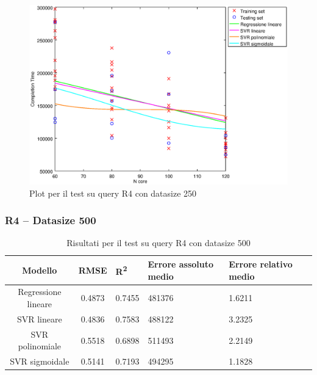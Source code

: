 \documentclass[a4paper,11pt]{article}
\begin{document}
\begin {figure}[hbtp]
\centering
\includegraphics[width=\textwidth]{output/R4_250/plot_R4_250.eps}
\caption {Plot per il test su query R4 con datasize 250}
\end {figure}
\newpage
\subsubsection{R4 -- Datasize 500}
\begin{table}[bhpt]
	\centering
	\begin{adjustbox}{center}
		\begin{tabular}{c | c M{1cm} M{2.5cm} M{2.5cm} M{1.8cm}}
			Modello & RMSE & R\textsuperscript{2} & Errore assoluto medio & Errore relativo medio \tabularnewline
			\hline
			Regressione lineare & 0.4873 & 0.7455 & 481376 & 1.6211 \\
			SVR lineare & 0.4836 & 0.7583 & 488122 & 3.2325 \\
			SVR polinomiale & 0.5518 & 0.6898 & 511493 & 2.2149 \\
			SVR sigmoidale & 0.5141 & 0.7193 & 494295 & 1.1828 \\
		\end{tabular}
	\end{adjustbox}
	\\
	\caption{Risultati per il test su query R4 con datasize 500}
	\label{table_R4_500}
\end{table}
\end{document}
